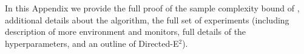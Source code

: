 \onecolumn
\begin{appendix}
    In this Appendix we provide the full proof of the sample complexity bound of \thealgo, additional details about the algorithm, the full set of experiments (including description of more environment and monitors, full details of the hyperparameters, and an outline of Directed-E$^2$). 
    
    
    
    \clearpage
    
    
    
    
    

    
    \clearpage

    

    
\end{appendix}